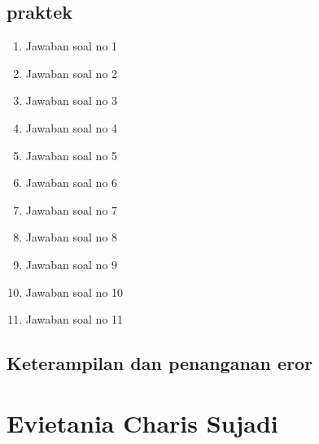 \subsection{praktek}
\begin{enumerate}
	\item Jawaban soal no 1
	
	\item Jawaban soal no 2
	
	\item Jawaban soal no 3
	
	\item Jawaban soal no 4
	
	\item Jawaban soal no 5
	
	\item Jawaban soal no 6
	
	\item Jawaban soal no 7
	
	\item Jawaban soal no 8
	
	\item Jawaban soal no 9
	
	\item Jawaban soal no 10
	
	\item Jawaban soal no 11
	
\end{enumerate}

\subsection{Keterampilan dan penanganan eror}
	
 \section{Evietania Charis Sujadi}
